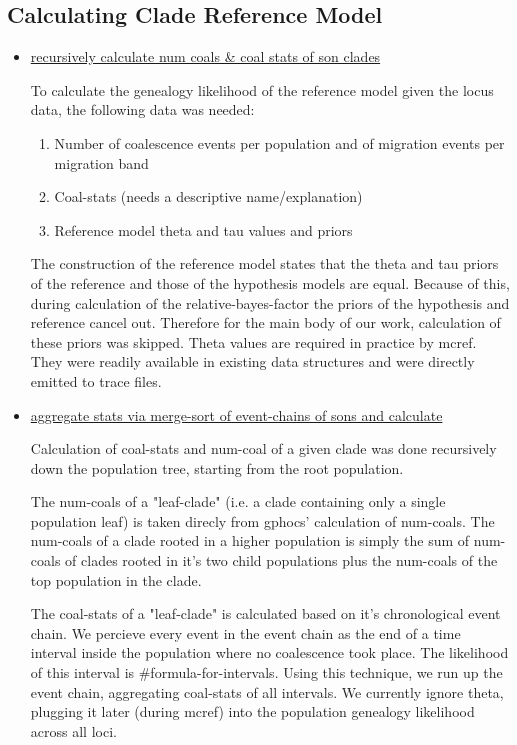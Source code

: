 \documentclass[10pt,a4paper]{article}
\begin{document}
\subsection{Calculating Clade Reference Model}
\begin{itemize}

\item \underline{recursively calculate num coals \& coal stats of son clades}

To calculate the genealogy likelihood of the reference model given the locus data, the following data was needed:
\begin{enumerate}
\item Number of coalescence events per population and of migration events per migration band
\item Coal-stats (needs a descriptive name/explanation)
\item Reference model theta and tau values and priors
\end{enumerate}


The construction of the reference model states that the theta and tau priors of the reference and those of the hypothesis models are
equal. Because of this, during calculation of the relative-bayes-factor the priors of the hypothesis and reference cancel out. Therefore for the main body of our work, calculation of these priors was skipped. Theta values are required in practice by mcref. They were readily available in existing data structures and were directly emitted to trace files.


\item \underline{aggregate stats via merge-sort of event-chains of sons and calculate}

Calculation of coal-stats and num-coal of a given clade was done recursively down the population tree, starting from the root population. 

The num-coals of a "leaf-clade" (i.e. a clade containing only a single population leaf) is taken direcly from gphocs' calculation of num-coals. The num-coals of a clade rooted in a higher population is simply the sum of num-coals of clades rooted in it's two child populations plus the num-coals of the top population in the clade.

The coal-stats of a "leaf-clade" is calculated based on it's chronological event chain. We percieve every event in the event chain as the end of a time interval inside the population where no coalescence took place. The likelihood of this interval is \#formula-for-intervals. Using this technique, we run up the event chain, aggregating coal-stats of all intervals. We currently ignore theta, plugging it later (during mcref) into the population genealogy likelihood across all loci. 


\end{itemize}
\end{document}
